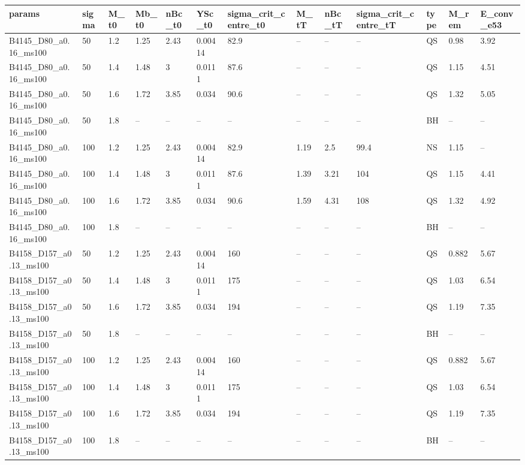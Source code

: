 \begin{tabular}{lllllllllllll}
\hline
params & sigma & M\_t0 & Mb\_t0 & nBc\_t0 & YSc\_t0 & sigma\_crit\_centre\_t0 & M\_tT & nBc\_tT & sigma\_crit\_centre\_tT & type & M\_rem & E\_conv\_e53 \\
\hline
B4145\_D80\_a0.16\_ms100 & 50 & 1.2 & 1.25 & 2.43 & 0.00414 & 82.9 & -- & -- & -- & QS & 0.98 & 3.92 \\
B4145\_D80\_a0.16\_ms100 & 50 & 1.4 & 1.48 & 3 & 0.0111 & 87.6 & -- & -- & -- & QS & 1.15 & 4.51 \\
B4145\_D80\_a0.16\_ms100 & 50 & 1.6 & 1.72 & 3.85 & 0.034 & 90.6 & -- & -- & -- & QS & 1.32 & 5.05 \\
B4145\_D80\_a0.16\_ms100 & 50 & 1.8 & -- & -- & -- & -- & -- & -- & -- & BH & -- & -- \\
B4145\_D80\_a0.16\_ms100 & 100 & 1.2 & 1.25 & 2.43 & 0.00414 & 82.9 & 1.19 & 2.5 & 99.4 & NS & 1.15 & -- \\
B4145\_D80\_a0.16\_ms100 & 100 & 1.4 & 1.48 & 3 & 0.0111 & 87.6 & 1.39 & 3.21 & 104 & QS & 1.15 & 4.41 \\
B4145\_D80\_a0.16\_ms100 & 100 & 1.6 & 1.72 & 3.85 & 0.034 & 90.6 & 1.59 & 4.31 & 108 & QS & 1.32 & 4.92 \\
B4145\_D80\_a0.16\_ms100 & 100 & 1.8 & -- & -- & -- & -- & -- & -- & -- & BH & -- & -- \\
B4158\_D157\_a0.13\_ms100 & 50 & 1.2 & 1.25 & 2.43 & 0.00414 & 160 & -- & -- & -- & QS & 0.882 & 5.67 \\
B4158\_D157\_a0.13\_ms100 & 50 & 1.4 & 1.48 & 3 & 0.0111 & 175 & -- & -- & -- & QS & 1.03 & 6.54 \\
B4158\_D157\_a0.13\_ms100 & 50 & 1.6 & 1.72 & 3.85 & 0.034 & 194 & -- & -- & -- & QS & 1.19 & 7.35 \\
B4158\_D157\_a0.13\_ms100 & 50 & 1.8 & -- & -- & -- & -- & -- & -- & -- & BH & -- & -- \\
B4158\_D157\_a0.13\_ms100 & 100 & 1.2 & 1.25 & 2.43 & 0.00414 & 160 & -- & -- & -- & QS & 0.882 & 5.67 \\
B4158\_D157\_a0.13\_ms100 & 100 & 1.4 & 1.48 & 3 & 0.0111 & 175 & -- & -- & -- & QS & 1.03 & 6.54 \\
B4158\_D157\_a0.13\_ms100 & 100 & 1.6 & 1.72 & 3.85 & 0.034 & 194 & -- & -- & -- & QS & 1.19 & 7.35 \\
B4158\_D157\_a0.13\_ms100 & 100 & 1.8 & -- & -- & -- & -- & -- & -- & -- & BH & -- & -- \\
\hline
\end{tabular}
